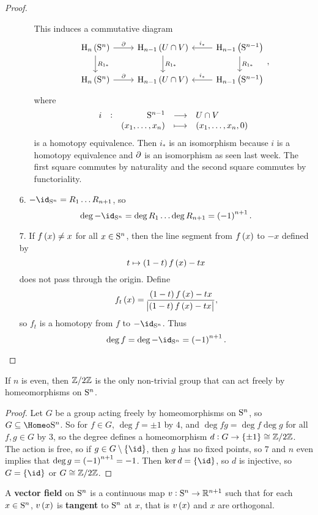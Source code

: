 \begin{proof}
\begin{itemize}
\begin{itemize}[leftmargin=2cm]
This induces a commutative diagram
$$
\begin{tikzcd}
\H_n\br{\S^n} \arrow{r}{\da} \arrow{d}{R_{1*}} & \H_{n - 1}\br{U \cap V} \arrow{d}{R_{1*}} & \H_{n - 1}\br{\S^{n - 1}}\arrow{l}[swap]{i_*} \arrow{d}{R_{1*}} \\
\H_n\br{\S^n} \arrow{r}{\da} & \H_{n - 1}\br{U \cap V} & \H_{n - 1}\br{\S^{n - 1}}\arrow{l}[swap]{i_*}
\end{tikzcd},
$$
where
$$ \function[i]{\S^{n - 1}}{U \cap V}{\br{x_1, \dots, x_n}}{\br{x_1, \dots, x_n, 0}} $$
is a homotopy equivalence. Then $ i_* $ is an isomorphism because $ i $ is a homotopy equivalence and $ \da $ is an isomorphism as seen last week. The first square commutes by naturality and the second square commutes by functoriality.
\end{itemize}
\item[$ 6 $.] $ -\id_{\S^n} = R_1 \dots R_{n + 1} $, so
$$ \deg -\id_{\S^n} = \deg R_1 \dots \deg R_{n + 1} = \br{-1}^{n + 1}. $$
\item[$ 7 $.] If $ f\br{x} \ne x $ for all $ x \in \S^n $, then the line segment from $ f\br{x} $ to $ -x $ defined by
$$ t \mapsto \br{1 - t}f\br{x} - tx $$
does not pass through the origin. Define
$$ f_t\br{x} = \dfrac{\br{1 - t}f\br{x} - tx}{\abs{\br{1 - t}f\br{x} - tx}}, $$
so $ f_t $ is a homotopy from $ f $ to $ -\id_{\S^n} $. Thus
$$ \deg f = \deg -\id_{\S^n} = \br{-1}^{n + 1}. $$
\end{itemize}
\end{proof}

\begin{proposition}
If $ n $ is even, then $ \ZZ / 2\ZZ $ is the only non-trivial group that can act freely by homeomorphisms on $ \S^n $.
\end{proposition}

\begin{proof}
Let $ G $ be a group acting freely by homeomorphisms on $ \S^n $, so $ G \subseteq \Homeo \S^n $. So for $ f \in G $, $ \deg f = \pm 1 $ by $ 4 $, and $ \deg fg = \deg f\deg g $ for all $ f, g \in G $ by $ 3 $, so the degree defines a homeomorphism $ d : G \to \cbr{\pm 1} \cong \ZZ / 2\ZZ $. The action is free, so if $ g \in G \setminus \cbr{\id} $, then $ g $ has no fixed points, so $ 7 $ and $ n $ even implies that $ \deg g = \br{-1}^{n + 1} = -1 $. Then $ \ker d = \cbr{\id} $, so $ d $ is injective, so $ G = \cbr{\id} $ or $ G \cong \ZZ / 2\ZZ $.
\end{proof}

\begin{definition*}
A \textbf{vector field} on $ \S^n $ is a continuous map $ v : \S^n \to \RR^{n + 1} $ such that for each $ x \in \S^n $, $ v\br{x} $ is \textbf{tangent} to $ \S^n $ at $ x $, that is $ v\br{x} $ and $ x $ are orthogonal.
\end{definition*}

